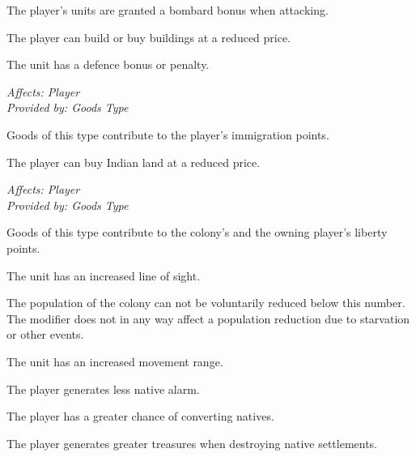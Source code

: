 \documentclass[12pt]{book}
\begin{document}
The player's units are granted a bombard bonus when attacking.

\affectsPlayer

The player can build or buy buildings at a reduced price.

\affectsUnit

The unit has a defence bonus or penalty.

\textit{Affects: Player\\Provided by: Goods Type}

Goods of this type contribute to the player's immigration points.

\affectsPlayer

The player can buy Indian land at a reduced price.

\textit{Affects: Player\\Provided by: Goods Type}

Goods of this type contribute to the colony's and the owning player's
liberty points.

\affectsUnit

The unit has an increased line of sight.

\affectsColonyTwo

The population of the colony can not be voluntarily reduced below this
number. The modifier does not in any way affect a population reduction
due to starvation or other events.

\affectsUnit

The unit has an increased movement range.

\affectsPlayer

The player generates less native alarm.

\affectsPlayer

The player has a greater chance of converting natives.

\affectsPlayer

The player generates greater treasures when destroying native settlements.

\affectsUnit
\end{document}
